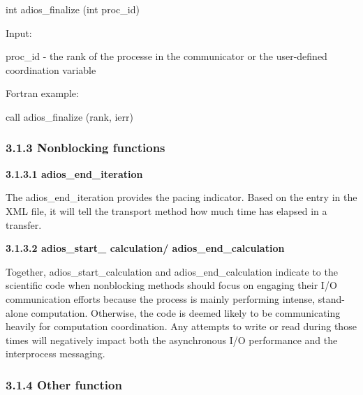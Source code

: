 \vspace{10pt}
\leftskip=22pt
int adios\_finalize (int proc\_id)

\vspace{10pt}
\leftskip=22pt
Input: 

\vspace{10pt}
\leftskip=40pt
proc\_id - the rank of the processe in the communicator or the user-defined coordination 
variable

\vspace{22pt}
\leftskip=22pt
Fortran example: 

\vspace{10pt}
call adios\_finalize (rank, ierr)\label{HToc84890237}\label{HToc212016613}\label{HToc212016855}\label{HToc182553351}

\vspace{10pt}
\subsubsection*{{\large \textbf{3.1.3 Nonblocking functions}}}

\vspace{10pt}
\leftskip=0pt
\textbf{3.1.3.1 adios\_end\_iteration}

\vspace{10pt}
The adios\_end\_iteration provides the pacing indicator. Based on the entry in 
the XML file, it will tell the transport method how much time has elapsed in a 
transfer.

\vspace{10pt}
\textbf{3.1.3.2 adios\_start\_ calculation/ adios\_end\_calculation}

\vspace{10pt}
Together, adios\_start\_calculation and adios\_end\_calculation indicate to the 
scientific code when nonblocking methods should focus on engaging their I/O communication 
efforts because the process is mainly performing intense, stand-alone computation. 
Otherwise, the code is deemed likely to be communicating heavily for computation 
coordination. Any attempts to write or read during those times will negatively 
impact both the asynchronous I/O performance and the interprocess messaging.\label{HToc212016614}\label{HToc212016856}\label{HToc84890238}\label{HToc182553352}

\vspace{10pt}
\subsubsection*{{\large \textbf{3.1.4 Other function}}}

